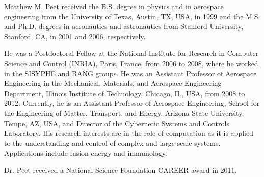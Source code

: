 \documentclass[9pt,journal,twocolumn]{IEEEtran}
\begin{document}
\begin{IEEEbiographynophoto}{Matthew M. Peet}
received the B.S. degree in physics and in aerospace engineering from the University of Texas, Austin, TX, USA, in 1999 and the M.S. and Ph.D. degrees in aeronautics and astronautics from Stanford University, Stanford, CA, in 2001 and 2006,
respectively.

He was a Postdoctoral Fellow at the National Institute for Research in Computer Science and Control (INRIA), Paris, France, from 2006 to 2008, where he worked in the SISYPHE and BANG groups. He was an Assistant Professor of Aerospace Engineering in the Mechanical, Materials, and Aerospace Engineering Department, Illinois Institute of Technology, Chicago, IL, USA, from 2008 to 2012. Currently, he is an Assistant Professor of Aerospace Engineering, School for the Engineering of Matter, Transport, and Energy, Arizona State University, Tempe, AZ, USA, and Director of the Cybernetic Systems and Controls Laboratory. His research interests are in the role of computation as it is applied to the understanding and control of complex and large-scale systems. Applications include fusion energy and immunology.

Dr. Peet received a National Science Foundation CAREER award in 2011.
\end{IEEEbiographynophoto}
\end{document}
